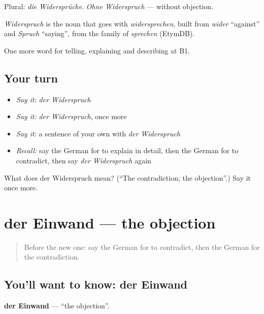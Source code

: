 Plural: \emph{die Widersprüche}. \emph{Ohne Widerspruch} — without objection.

\begin{cousinweb}
\emph{Widerspruch} is the noun that goes with \emph{widersprechen}, built from \emph{wider} \textquotedblleft{}against\textquotedblright{} and \emph{Spruch} \textquotedblleft{}saying\textquotedblright{}, from the family of \emph{sprechen} (EtymDB).
\end{cousinweb}

\begin{grammarlens}[title={What you've built}]
One more word for telling, explaining and describing at B1.
\end{grammarlens}

\subsection*{Your turn}
\begin{itemize}
\raggedright
  \item \emph{Say it:} \emph{der Widerspruch}
  \item \emph{Say it:} \emph{der Widerspruch}, once more
  \item \emph{Say it:} a sentence of your own with \emph{der Widerspruch}
  \item \emph{Recall:} say the German for to explain in detail, then the German for to contradict, then say \emph{der Widerspruch} again
\end{itemize}

\begin{tcolorbox}[breakable,colback=teal!4,colframe=teal!35!black,title={Before you move on}]
What does der Widerspruch mean? (\textquotedblleft{}The contradiction; the objection\textquotedblright{}.) Say it once more.
\end{tcolorbox}
\section[der Einwand]{der Einwand — the objection}

\label{lesson:GE-C333-einwand}



\begin{quote}
Before the new one: say the German for to contradict, then the German for the contradiction.
\end{quote}

\subsection*{You'll want to know: der Einwand}
\textbf{der Einwand} — \textquotedblleft{}the objection\textquotedblright{}.

